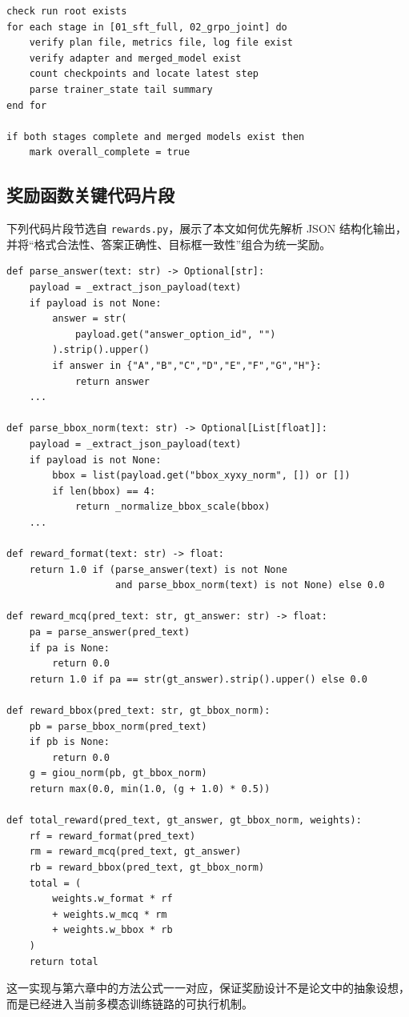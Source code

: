 \begin{thesisappendix}
\begin{verbatim}
check run root exists
for each stage in [01_sft_full, 02_grpo_joint] do
    verify plan file, metrics file, log file exist
    verify adapter and merged_model exist
    count checkpoints and locate latest step
    parse trainer_state tail summary
end for

if both stages complete and merged models exist then
    mark overall_complete = true
\end{verbatim}

\subsection{奖励函数关键代码片段}
\label{app:reward-code}

下列代码片段节选自 \texttt{rewards.py}，展示了本文如何优先解析 JSON 结构化输出，并将“格式合法性、答案正确性、目标框一致性”组合为统一奖励。

\begin{verbatim}
def parse_answer(text: str) -> Optional[str]:
    payload = _extract_json_payload(text)
    if payload is not None:
        answer = str(
            payload.get("answer_option_id", "")
        ).strip().upper()
        if answer in {"A","B","C","D","E","F","G","H"}:
            return answer
    ...

def parse_bbox_norm(text: str) -> Optional[List[float]]:
    payload = _extract_json_payload(text)
    if payload is not None:
        bbox = list(payload.get("bbox_xyxy_norm", []) or [])
        if len(bbox) == 4:
            return _normalize_bbox_scale(bbox)
    ...

def reward_format(text: str) -> float:
    return 1.0 if (parse_answer(text) is not None
                   and parse_bbox_norm(text) is not None) else 0.0

def reward_mcq(pred_text: str, gt_answer: str) -> float:
    pa = parse_answer(pred_text)
    if pa is None:
        return 0.0
    return 1.0 if pa == str(gt_answer).strip().upper() else 0.0

def reward_bbox(pred_text: str, gt_bbox_norm):
    pb = parse_bbox_norm(pred_text)
    if pb is None:
        return 0.0
    g = giou_norm(pb, gt_bbox_norm)
    return max(0.0, min(1.0, (g + 1.0) * 0.5))

def total_reward(pred_text, gt_answer, gt_bbox_norm, weights):
    rf = reward_format(pred_text)
    rm = reward_mcq(pred_text, gt_answer)
    rb = reward_bbox(pred_text, gt_bbox_norm)
    total = (
        weights.w_format * rf
        + weights.w_mcq * rm
        + weights.w_bbox * rb
    )
    return total
\end{verbatim}

这一实现与第六章中的方法公式一一对应，保证奖励设计不是论文中的抽象设想，而是已经进入当前多模态训练链路的可执行机制。
\end{thesisappendix}
